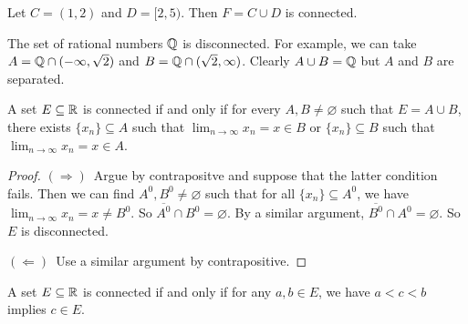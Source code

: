 \begin{example}
  Let $C = (1, 2)$ and $D = [2, 5)$. Then $F = C \cup D$ is
  connected.
\end{example}

\begin{example}
  The set of rational numbers $\mathbb{Q}$ is disconnected.
  For example, we can take $A = \mathbb{Q} \cap (-\infty, \sqrt{2})$
  and $B = \mathbb{Q} \cap (\sqrt{2}, \infty)$. Clearly
  $A \cup B = \mathbb{Q}$ but $A$ and $B$ are separated.
\end{example}

\begin{theorem}
  A set $E \subseteq \mathbb{R}$ is connected if and only if for every
  $A, B \ne \varnothing$ such that $E = A \cup B$, there exists
  $\{x_n\} \subseteq A$ such that
  $\lim_{n \to \infty} x_n = x \in B$ or $\{x_n\} \subseteq B$
  such that $\lim_{n \to \infty} x_n = x \in A$.
\end{theorem}

\begin{proof}
  $(\Rightarrow)$\, Argue by contrapositve and suppose that
  the latter condition fails.
  Then we can find $A^0, B^0 \ne \varnothing$ such that
  for all $\{x_n\} \subseteq A^0$,  we have
  $\lim_{n \to \infty} x_n = x \ne B^0$. So
  $\overline{A^0} \cap B^0 = \varnothing$. By a similar argument,
  $\overline{B^0} \cap A^0 = \varnothing$. So $E$ is disconnected.

  $(\Leftarrow)$\, Use a similar argument by contrapositive.
\end{proof}

\begin{theorem}
  A set $E \subseteq \mathbb{R}$ is connected if and only if
  for any $a, b \in E$, we have $a < c < b$ implies $c \in E$.
\end{theorem}

